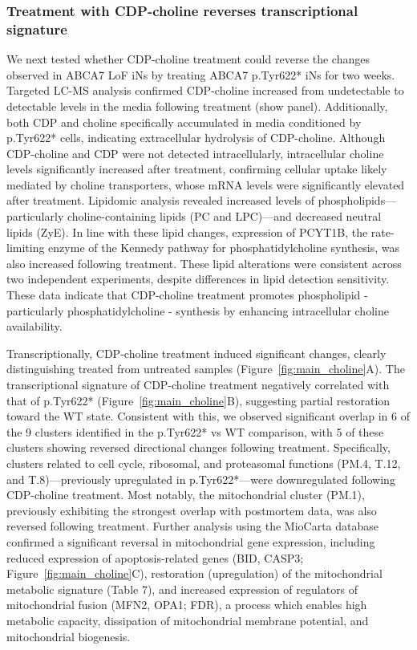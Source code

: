 \subsubsection{Treatment with CDP-choline reverses transcriptional signature}

We next tested whether CDP-choline treatment could reverse the changes observed in ABCA7 LoF iNs by treating ABCA7 p.Tyr622* iNs for two weeks. Targeted LC-MS analysis confirmed CDP-choline increased from undetectable to detectable levels in the media following treatment (show panel). Additionally, both CDP and choline specifically accumulated in media conditioned by p.Tyr622* cells, indicating extracellular hydrolysis of CDP-choline. Although CDP-choline and CDP were not detected intracellularly, intracellular choline levels significantly increased after treatment, confirming cellular uptake likely mediated by choline transporters, whose mRNA levels were significantly elevated after treatment. Lipidomic analysis revealed increased levels of phospholipids—particularly choline-containing lipids (PC and LPC)—and decreased neutral lipids (ZyE). In line with these lipid changes, expression of PCYT1B, the rate-limiting enzyme of the Kennedy pathway for phosphatidylcholine synthesis, was also increased following treatment. These lipid alterations were consistent across two independent experiments, despite differences in lipid detection sensitivity. These data indicate that CDP-choline treatment promotes phospholipid - particularly phosphatidylcholine - synthesis by enhancing intracellular choline availability.

Transcriptionally, CDP-choline treatment induced significant changes, clearly distinguishing treated from untreated samples (Figure~\ref{fig:main_choline}A). The transcriptional signature of CDP-choline treatment negatively correlated with that of p.Tyr622* (Figure~\ref{fig:main_choline}B), suggesting partial restoration toward the WT state. Consistent with this, we observed significant overlap in 6 of the 9 clusters identified in the p.Tyr622* vs WT comparison, with 5 of these clusters showing reversed directional changes following treatment. Specifically, clusters related to cell cycle, ribosomal, and proteasomal functions (PM.4, T.12, and T.8)—previously upregulated in p.Tyr622*—were downregulated following CDP-choline treatment. Most notably, the mitochondrial cluster (PM.1), previously exhibiting the strongest overlap with postmortem data, was also reversed following treatment. Further analysis using the MioCarta database confirmed a significant reversal in mitochondrial gene expression, including reduced expression of apoptosis-related genes (BID, CASP3; Figure~\ref{fig:main_choline}C), restoration (upregulation) of the mitochondrial metabolic signature (Table 7), and increased expression of regulators of mitochondrial fusion (MFN2, OPA1; FDR), a process which enables high metabolic capacity, dissipation of mitochondrial membrane potential, and mitochondrial biogenesis.

